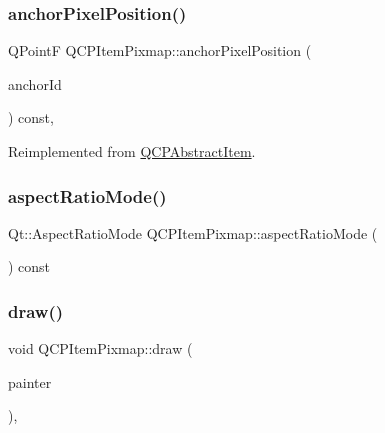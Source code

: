 \subsubsection{\texorpdfstring{anchorPixelPosition()}{anchorPixelPosition()}}
{\footnotesize\ttfamily Q\+PointF Q\+C\+P\+Item\+Pixmap\+::anchor\+Pixel\+Position (\begin{DoxyParamCaption}\item[{int}]{anchor\+Id }\end{DoxyParamCaption}) const\hspace{0.3cm}{\ttfamily [protected]}, {\ttfamily [virtual]}}



Reimplemented from \mbox{\hyperlink{class_q_c_p_abstract_item_ada5bad4e1196c4fc0d0d12328e24b8f2}{Q\+C\+P\+Abstract\+Item}}.

\mbox{\label{class_q_c_p_item_pixmap_a662cbca12e6cdcd2a94b0b08879292fd}} 
\subsubsection{\texorpdfstring{aspectRatioMode()}{aspectRatioMode()}}
{\footnotesize\ttfamily Qt\+::\+Aspect\+Ratio\+Mode Q\+C\+P\+Item\+Pixmap\+::aspect\+Ratio\+Mode (\begin{DoxyParamCaption}{ }\end{DoxyParamCaption}) const\hspace{0.3cm}{\ttfamily [inline]}}

\mbox{\label{class_q_c_p_item_pixmap_a9538a7d37fe20a4ff4bb2cb5bbbf2b48}} 
\subsubsection{\texorpdfstring{draw()}{draw()}}
{\footnotesize\ttfamily void Q\+C\+P\+Item\+Pixmap\+::draw (\begin{DoxyParamCaption}\item[{\mbox{\hyperlink{class_q_c_p_painter}{Q\+C\+P\+Painter}} $\ast$}]{painter }\end{DoxyParamCaption})\hspace{0.3cm}{\ttfamily [protected]}, {\ttfamily [virtual]}}



